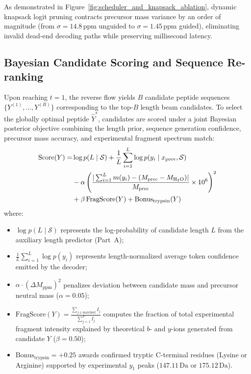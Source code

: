 As demonstrated in Figure~\ref{fig:scheduler_and_knapsack_ablation}, dynamic knapsack logit pruning contracts precursor mass variance by an order of magnitude (from $\sigma = 14.8\,\text{ppm}$ unguided to $\sigma = 1.45\,\text{ppm}$ guided), eliminating invalid dead-end decoding paths while preserving millisecond latency.

\subsection{Bayesian Candidate Scoring and Sequence Re-ranking}
\label{subsec:bayesian_scoring}

Upon reaching $t=1$, the reverse flow yields $B$ candidate peptide sequences $\{Y^{(1)}, \dots, Y^{(B)}\}$ corresponding to the top-$B$ length beam candidates. To select the globally optimal peptide $\hat{Y}^*$, candidates are scored under a joint Bayesian posterior objective combining the length prior, sequence generation confidence, precursor mass accuracy, and experimental fragment spectrum match:
\begin{align}
\text{Score}(Y) = &\log p(L \mid \mathcal{S}) + \frac{1}{L} \sum_{i=1}^L \log p(y_i \mid x_{\text{prev}}, \mathcal{S}) \notag \\
&- \alpha \left( \frac{|\sum_{i=1}^L m(y_i) - (M_{\text{prec}} - M_{\text{H}_2\text{O}})|}{M_{\text{prec}}} \times 10^6 \right)^2 \notag \\
&+ \beta \, \text{FragScore}(Y) + \text{Bonus}_{\text{trypsin}}(Y)
\label{eq:bayesian_reranking}
\end{align}
where:
\begin{itemize}
    \item $\log p(L \mid \mathcal{S})$ represents the log-probability of candidate length $L$ from the auxiliary length predictor (Part~A);
    \item $\frac{1}{L} \sum_{i=1}^L \log p(y_i)$ represents length-normalized average token confidence emitted by the decoder;
    \item $\alpha \cdot (\Delta M_{\text{ppm}})^2$ penalizes deviation between candidate mass and precursor neutral mass ($\alpha = 0.05$);
    \item $\text{FragScore}(Y) = \frac{\sum_{j \in \text{matched}} I_j}{\sum_{j=1}^P I_j}$ computes the fraction of total experimental fragment intensity explained by theoretical $b$- and $y$-ions generated from candidate $Y$ ($\beta = 0.50$);
    \item $\text{Bonus}_{\text{trypsin}} = +0.25$ awards confirmed tryptic C-terminal residues (Lysine or Arginine) \citep{Olsen2004, Vandermarliere2013} supported by experimental $y_1$ peaks ($147.11\,\text{Da}$ or $175.12\,\text{Da}$).
\end{itemize}

